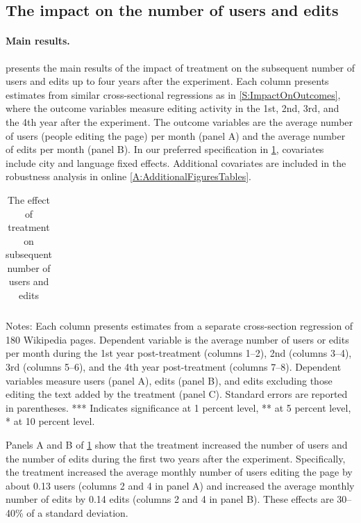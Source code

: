 \documentclass[12pt]{article}
\begin{document}
\subsection{The impact on the number of users and edits}\label{S:ImpactOnUsersEdits}

\paragraph{Main results. } 
 presents the main results of the impact of treatment on the subsequent number of users and edits up to four years after the experiment. Each column presents estimates from similar cross-sectional regressions as in \cref{S:ImpactOnOutcomes}, where the outcome variables measure editing activity in the 1st, 2nd, 3rd, and the 4th year after the experiment. The outcome variables are the average number of users (people editing the page) per month (panel A) and the average number of edits per month (panel B). In our preferred specification in \cref{T:RegrUsersCrossSection}, covariates include city and language fixed effects. Additional covariates are included in the robustness analysis in online \cref{A:AdditionalFiguresTables}.


\begin{table}[h!]
\begin{center}
\caption{The effect of treatment on subsequent number of users and edits}
\label{T:RegrUsersCrossSection}
\renewcommand{\tabcolsep}{3pt}
\begin{tabular}{ l cc cc cc cc }
\hline

\hline
\end{tabular}
\end{center}
\footnotesize{
Notes: Each column presents estimates from a separate cross-section regression of 180 Wikipedia pages. Dependent variable is the average number of users or edits per month during the 1st year post-treatment (columns 1--2), 2nd (columns 3--4), 3rd (columns 5--6), and the 4th year post-treatment (columns 7--8). Dependent variables measure users (panel A), edits (panel B), and edits excluding those editing the text added by the treatment (panel C).
Standard errors are reported in parentheses. *** Indicates significance at 1 percent level, ** at 5 percent level, * at 10 percent level.
}
\end{table}

Panels A and B of \cref{T:RegrUsersCrossSection} show that the treatment increased the number of users and the number of edits during the first two years after the experiment.
Specifically, the treatment increased the average monthly number of users editing the page by about 0.13 users (columns 2 and 4 in panel A) and increased the average monthly number of edits by 0.14 edits (columns 2 and 4 in panel B). These effects are 30--40\% of a standard deviation.
\end{document}
